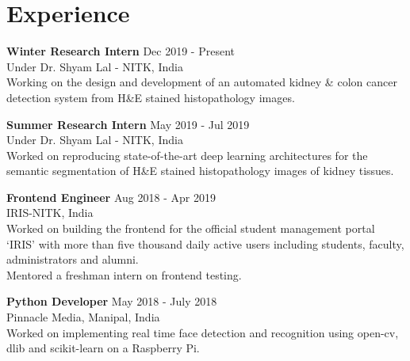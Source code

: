 \documentclass[letterpaper]{article}
\renewenvironment{itemize}{
  \begin{list}{}{
    \setlength{\leftmargin}{1.5em}
  }
}{
  \end{list}
}
\newcommand{\smallGreyFont}[1]{\textcolor{black!80}{\small{#1}}}
\begin{document}
\section*{Experience}
  \begin{itemize}
    \item \textbf{Winter Research Intern}
    \hfill{\textcolor{black!80}{\small{Dec 2019 - Present}}}\\
    \smallGreyFont{Under Dr. Shyam Lal - NITK, India}\\
      Working on the design and development of an automated kidney \& colon cancer detection system from H\&E stained histopathology images.

    \item \textbf{Summer Research Intern}
    \hfill{\textcolor{black!80}{\small{May 2019 - Jul 2019}}}\\
    \smallGreyFont{Under Dr. Shyam Lal - NITK, India}\\
      Worked on reproducing state-of-the-art deep learning architectures for the semantic segmentation of H\&E stained histopathology images of kidney tissues.

    \item \textbf{Frontend Engineer}
    \hfill{\textcolor{black!80}{\small{Aug 2018 - Apr 2019}}}\\
    \smallGreyFont{IRIS-NITK, India}\\
      Worked on building the frontend for the official student management portal `IRIS' with more than five thousand daily active users including students, faculty, administrators and alumni.\\
      Mentored a freshman intern on frontend testing.

    \item \textbf{Python Developer}
    \hfill{\textcolor{black!80}{\small{May 2018 - July 2018}}}\\
    \smallGreyFont{Pinnacle Media, Manipal, India}\\
      Worked on implementing real time face detection and recognition using open-cv, dlib and scikit-learn on a Raspberry Pi.
  \end{itemize}


\end{document}
